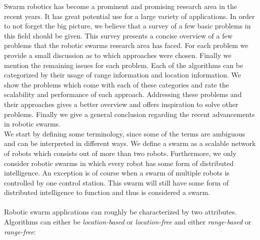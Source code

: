 



Swarm robotics has become a prominent and promising research area in the recent years. 
It has great potential use for a large variety of applications. 
In order to not forget the big picture, we believe that a survey of a few basic problems in this field should be given. 
This survey presents a concise overview of a few problems that the robotic swarms research area has faced. For each problem we provide a small discussion as to which approaches were chosen. 
Finally we mention the remaining issues for each problem. 
Each of the algorithms can be categorized by their usage of range information and location information. 
We show the problems which come with each of these categories and rate the scalability and performance of each approach. 
Addressing these problems and their approaches gives a better overview and offers inspiration to solve other problems.
Finally we give a general conclusion regarding the recent advancements in robotic swarms.
\\
We start by defining some terminology, since some of the terms are ambiguous and can be interpreted in different ways.
We define a swarm as a scalable network of robots which consists out of more than two robots.
Furthermore, we only consider robotic swarms in which every robot has some form of distributed intelligence.
An exception is of course when a swarm of multiple robots is controlled by one control station.
This swarm will still have some form of distributed intelligence to function and thus is considered a swarm.  \\
\\
Robotic swarm applications can roughly be characterized by two attributes. Algorithms can either be \emph{location-based} or \emph{location-free} and either \emph{range-based} or \emph{range-free}:
